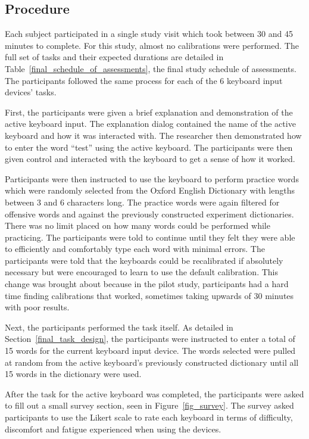 \subsection{Procedure} \label{final_procedure}
Each subject participated in a single study visit which took between 30 and 45 minutes to complete. For this study, almost no calibrations were performed. The full set of tasks and their expected durations are detailed in Table~\ref{final_schedule_of_assessments}, the final study schedule of assessments. The participants followed the same process for each of the 6 keyboard input devices' tasks.

First, the participants were given a brief explanation and demonstration of the active keyboard input. The explanation dialog contained the name of the active keyboard and how it was interacted with. The researcher then demonstrated how to enter the word ``test'' using the active keyboard. The participants were then given control and interacted with the keyboard to get a sense of how it worked.

Participants were then instructed to use the keyboard to perform practice words which were randomly selected from the Oxford English Dictionary with lengths between 3 and 6 characters long. The practice words were again filtered for offensive words and against the previously constructed experiment dictionaries. There was no limit placed on how many words could be performed while practicing. The participants were told to continue until they felt they were able to efficiently and comfortably type each word with minimal errors. The participants were told that the keyboards could be recalibrated if absolutely necessary but were encouraged to learn to use the default calibration. This change was brought about because in the pilot study, participants had a hard time finding calibrations that worked, sometimes taking upwards of 30 minutes with poor results.

Next, the participants performed the task itself. As detailed in Section~\ref{final_task_design}, the participants were instructed to enter a total of 15 words for the current keyboard input device. The words selected were pulled at random from the active keyboard's previously constructed dictionary until all 15 words in the dictionary were used.

After the task for the active keyboard was completed, the participants were asked to fill out a small survey section, seen in Figure~\ref{fig_survey}. The survey asked participants to use the Likert scale to rate each keyboard in terms of difficulty, discomfort and fatigue experienced when using the devices.

